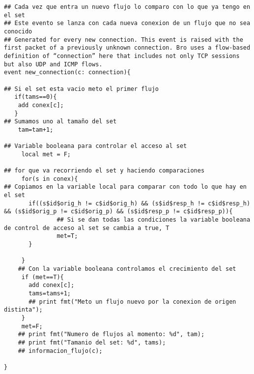 \begin{verbatim}
## Cada vez que entra un nuevo flujo lo comparo con lo que ya tengo en el set
## Este evento se lanza con cada nueva conexion de un flujo que no sea conocido
## Generated for every new connection. This event is raised with the first packet of a previously unknown connection. Bro uses a flow-based definition of “connection” here that includes not only TCP sessions but also UDP and ICMP flows.
event new_connection(c: connection){

## Si el set esta vacio meto el primer flujo
   if(tams==0){
    add conex[c];
   }
## Sumamos uno al tamaño del set
    tam=tam+1;

## Variable booleana para controlar el acceso al set
     local met = F;

## for que va recorriendo el set y haciendo comparaciones
     for(s in conex){
## Copiamos en la variable local para comparar con todo lo que hay en el set
       if((s$id$orig_h != c$id$orig_h) && (s$id$resp_h != c$id$resp_h) && (s$id$orig_p != c$id$orig_p) && (s$id$resp_p != c$id$resp_p)){
               ## Si se dan todas las condiciones la variable booleana de control de acceso al set se cambia a true, T
               met=T;
       }

     }
    ## Con la variable booleana controlamos el crecimiento del set
     if (met==T){
       add conex[c];
       tams=tams+1;
       ## print fmt("Meto un flujo nuevo por la conexion de origen distinta");
     }
     met=F;
    ## print fmt("Numero de flujos al momento: %d", tam);
    ## print fmt("Tamanio del set: %d", tams);
    ## informacion_flujo(c);

}
\end{verbatim}

